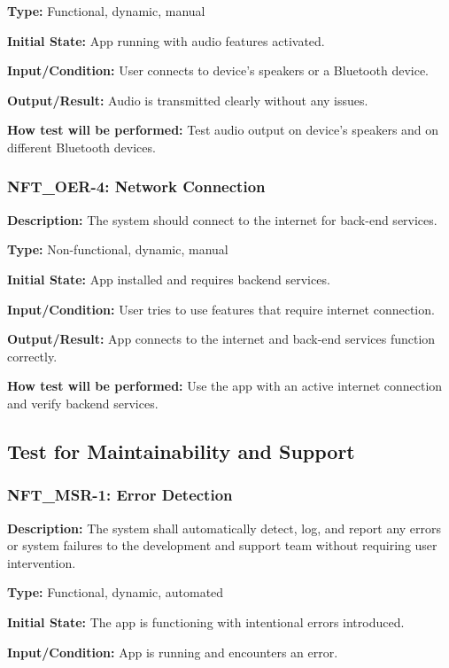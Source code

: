 \documentclass[12pt, titlepage]{article}
\begin{document}
\textbf{Type:} Functional, dynamic, manual

\textbf{Initial State:} App running with audio features activated.

\textbf{Input/Condition: }User connects to device’s speakers or a Bluetooth device.

\textbf{Output/Result:} Audio is transmitted clearly without any issues.

\textbf{How test will be performed: }Test audio output on device’s speakers and on different Bluetooth devices.


\subsubsection*{\textbf{NFT\_OER-4: Network Connection}
}

\textbf{Description: }The system should connect to the internet for back-end services.

\textbf{Type: }Non-functional, dynamic, manual

\textbf{Initial State: }App installed and requires backend services.

\textbf{Input/Condition: }User tries to use features that require internet connection.

\textbf{Output/Result:} App connects to the internet and back-end services function correctly.

\textbf{How test will be performed:} Use the app with an active internet connection and verify backend services.
\newline
\subsection{Test for Maintainability and Support}


\subsubsection*{\textbf{NFT\_MSR-1:} Error Detection}

\textbf{Description: }The system shall automatically detect, log, and report any errors or system failures to the development and support team without requiring user intervention. 

\textbf{Type: }Functional, dynamic, automated

\textbf{Initial State: }The app is functioning with intentional errors introduced.

\textbf{Input/Condition:} App is running and encounters an error.
\end{document}
